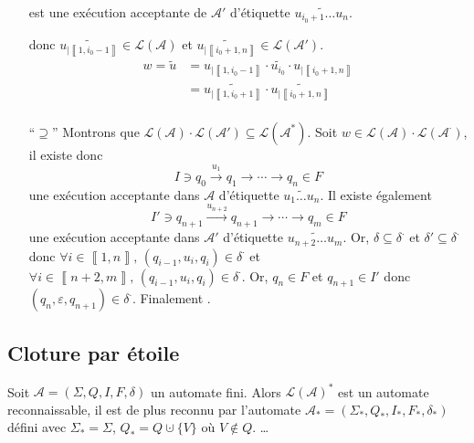 \begin{prv}
\begin{itemize}
\begin{multicols}{2}
				est une exécution acceptante de $\mathcal{A}'$\/ d'étiquette $\widetilde{u_{i_0+1}\ldots u_{n}}$.
			\end{multicols}
			donc $\widetilde{u_{|\left\llbracket 1,i_0-1 \right\rrbracket}} \in \mathcal{L}(\mathcal{A})$\/ et $\widetilde{u_{|\left\llbracket i_0+1,n \right\rrbracket}} \in \mathcal{L}(\mathcal{A}')$.
			\begin{align*}
				w = \tilde u &= \widetilde{u_{|\left\llbracket 1,i_0-1 \right\rrbracket} \cdot u_{i_0}\cdot u_{|\left\llbracket i_0+1,n \right\rrbracket}}\\
					&= \widetilde{u_{|\left\llbracket 1,i_0+1 \right\rrbracket}} \cdot  \widetilde{u_{|\left\llbracket i_0 + 1,n \right\rrbracket}} \\
			\end{align*}
		\item[``$\supseteq$''] Montrons que $\mathcal{L}(\mathcal{A}) \cdot \mathcal{L}(\mathcal{A}') \subseteq \mathcal{L}(\mathcal{A}^*)$. Soit $w \in \mathcal{L}(\mathcal{A}) \cdot \mathcal{L}(\mathcal{A}^\cdot)$, il existe donc \[
			I \ni q_0\xrightarrow{u_1} q_1 \to \cdots \to q_n \in F
		\] une exécution acceptante dans $\mathcal{A}$\/ d'étiquette $\widetilde{u_1\ldots u_n}$. Il existe également \[
			I' \ni q_{n+1} \xrightarrow{u_{n+2}} q_{n+1} \to \cdots \to q_m \in F
		\] une exécution acceptante dans $\mathcal{A}'$\/ d'étiquette $\widetilde{u_{n+2}\ldots u_{m}}$. Or, $\delta \subseteq \delta^\cdot$\/ et $\delta' \subseteq \delta^\cdot $\/ donc $\forall i \in \left\llbracket 1,n \right\rrbracket,\,(q_{i-1}, u_i, q_i) \in \delta^\cdot$\/ et $\forall i \in \left\llbracket n+2,m \right\rrbracket,\,(q_{i-1}, u_i, q_i) \in \delta^\cdot$. Or, $q_n \in F$\/ et $q_{n+1} \in I'$\/ donc $(q_n, \varepsilon, q_{n+1}) \in \delta^\cdot$. Finalement .
	\end{itemize}
\end{prv}

\subsection{Cloture par étoile}

\begin{prop}
	Soit $\mathcal{A} = (\Sigma, Q, I, F, \delta)$\/ un automate fini.
	Alors $\mathcal{L}(\mathcal{A})^*$\/ est un automate reconnaissable, il est de plus reconnu par l'automate $\mathcal{A}_* = (\Sigma_*, Q_*, I_*, F_*, \delta_*)$\/ défini avec $\Sigma_* = \Sigma$, $Q_* = Q \cupdot \{V\}$\/ où $V \not\in Q$. \ldots
\end{prop}


